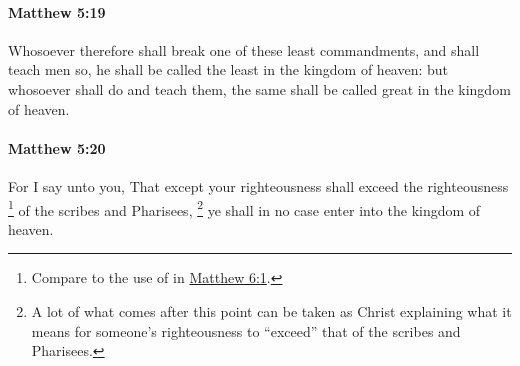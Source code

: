		\paragraph{Matthew 5:19} %
			\label{MATTHEW-5-19}

			Whosoever therefore shall break one of these least commandments, and shall teach men so, he shall be called the least in the kingdom of heaven: but whosoever shall do and teach them, the same shall be called great in the kingdom of heaven.

			\begin{framed}
			\scriptsize
				\begin{compactdesc}
					\item[SBLG] 
				\end{compactdesc}
			\end{framed}

		\paragraph{Matthew 5:20} %
			\label{MATTHEW-5-20}

			For I say unto you, That except your righteousness shall exceed the righteousness%
				\footnote{%
					Compare to the use of  in \hyperref[MATTHEW-6-1]{Matthew 6:1}.
					} 
			of the scribes and Pharisees,%
				\footnote{%
					A lot of what comes after this point can be taken as Christ explaining what it means for someone's righteousness to ``exceed'' that of the scribes and Pharisees.
					}
			ye shall in no case enter into the kingdom of heaven.

